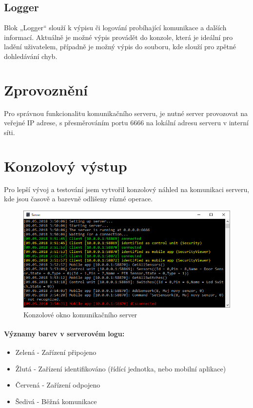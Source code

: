\documentclass[FM,DP]{tulthesis}  %
\begin{document}
\subsection{Logger}
Blok „Logger“ slouží k výpisu či logování probíhající komunikace a dalších informací. Aktuálně je možné výpis provádět do konzole, která je ideální pro ladění uživatelem, případně je možný výpis do souboru, kde slouží pro zpětné dohledávání chyb.

\section{Zprovoznění}
Pro správnou funkcionalitu komunikačního serveru, je nutné server provozovat na veřejné IP adrese, s přesměrováním portu 6666 na lokální adresu serveru v interní síti.

\section{Konzolový výstup}
Pro lepší vývoj a testování jsem vytvořil konzolový náhled na komunikaci serveru, kde jsou časově a barevně odlišeny různé operace.

\begin{figure}[H]
\begin{center}
\includegraphics[width=\textwidth]{images/serverView.png}
\caption{Konzolové okno komunikačního server}
\label{image}
\end{center}
\end{figure}

\paragraph{Významy barev v serverovém logu:}
\begin{itemize}
\item Zelená - Zařízení připojeno
\item Žlutá - Zařízení identifikováno (řídící jednotka, nebo mobilní aplikace)
\item Červená - Zařízení odpojeno
\item Šedivá - Běžná komunikace
\end{itemize}
\end{document}
